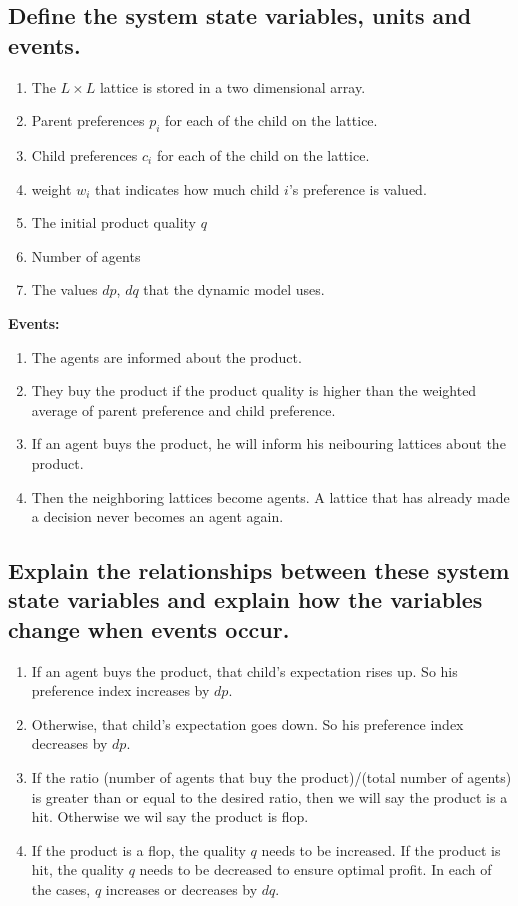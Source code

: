 \documentclass[article, 11pt, a4paper, onesize]{memoir}
\begin{document}
\subsection{Define the system state variables, units and events.}

\begin{enumerate}
	\item The \(L\times L\) lattice is stored in a two dimensional array.
    \item Parent preferences \(p_i\) for each of the child on the lattice.
    \item Child preferences \(c_i\) for each of the child on the lattice.
    \item weight \(w_i\) that indicates how much child $i$'s preference is valued.
    \item The initial product quality \(q\)
	\item Number of agents
    \item The values \(dp\), \(dq\) that the dynamic model uses.
\end{enumerate}

\textbf{Events:}
\begin{enumerate}
	\item The agents are informed about the product.
    \item They buy the product if the product quality is higher than the weighted average
        of parent preference and child preference.
    \item If an agent buys the product, he will inform his neibouring lattices about the
        product. 
    \item Then the neighboring lattices become agents. A lattice that has already made a
        decision never becomes an agent again.
\end{enumerate}


\subsection{Explain the relationships between these system state variables and explain how
the variables change when events occur.}

\begin{enumerate}
    \item If an agent buys the product, that child's expectation rises up. So his
        preference index increases by \(dp\).
    \item Otherwise, that child's expectation goes down. So his preference index decreases
        by \(dp\).
    \item If the ratio (number of agents that buy the product)/(total number of agents) is
        greater than or equal to the desired ratio, then we will say the product is a hit.
        Otherwise we wil say the product is flop.
    \item If the product is a flop, the quality \(q\) needs to be increased. If the
        product is hit, the quality \(q\) needs to be decreased to ensure optimal profit.
        In each of the cases, \(q\) increases or decreases by \(dq\).
\end{enumerate}
\end{document}
